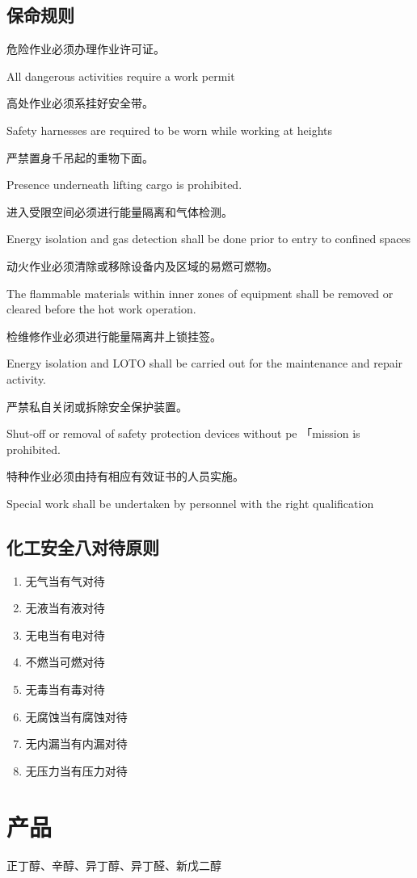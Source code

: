 \documentclass{book}
\begin{document}
\section{保命规则}

危险作业必须办理作业许可证。

All dangerous activities require a work permit

高处作业必须系挂好安全带。

Safety harnesses are required to be worn while working at heights

严禁置身千吊起的重物下面。

Presence underneath lifting cargo is prohibited.

进入受限空间必须进行能量隔离和气体检测。

Energy isolation and gas detection shall be done prior to entry to confined spaces

动火作业必须清除或移除设备内及区域的易燃可燃物。

The flammable materials within inner zones of equipment shall be removed
or cleared before the hot work operation.

检维修作业必须进行能量隔离井上锁挂签。

Energy isolation and LOTO shall be carried out for the maintenance and repair activity.

严禁私自关闭或拆除安全保护装置。

Shut-off or removal of safety protection devices without pe 「mission is prohibited.

特种作业必须由持有相应有效证书的人员实施。

Special work shall be undertaken by personnel with the right qualification

\section{化工安全八对待原则}

\begin{enumerate}
    \item 无气当有气对待
    \item 无液当有液对待
    \item 无电当有电对待
    \item 不燃当可燃对待
    \item 无毒当有毒对待
    \item 无腐蚀当有腐蚀对待
    \item 无内漏当有内漏对待
    \item 无压力当有压力对待
\end{enumerate}

\chapter{产品}

正丁醇、辛醇、异丁醇、异丁醛、新戊二醇
\end{document}
